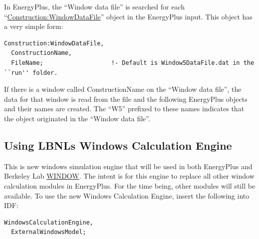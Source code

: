 In EnergyPlus, the ``Window data file'' is searched for each ``\hyperref[constructionwindowdatafile]{Construction:WindowDataFile}'' object in the EnergyPlus input. This object has a very simple form:

\begin{lstlisting}
Construction:WindowDataFile,
  ConstructionName,
  FileName;                   !- Default is Window5DataFile.dat in the ``run'' folder.
\end{lstlisting}

If there is a window called ConstructionName on the ``Window data file'', the data for that window is read from the file and the following EnergyPlus objects and their names are created. The ``W5'' prefixed to these names indicates that the object originated in the ``Window data file''.

\subsection{Using LBNLs Windows Calculation Engine}\label{windowscalculationengine}
This is new windows simulation engine that will be used in both EnergyPlus and Berkeley Lab \href{https://windows.lbl.gov/software-tools#window-heading}{WINDOW}. The intent is for this engine to replace all other window calculation modules in EnergyPlus. For the time being, other modules will still be available. To use the new Windows Calculation Engine, insert the following into IDF:

\begin{lstlisting}
WindowsCalculationEngine,
  ExternalWindowsModel;
\end{lstlisting}
